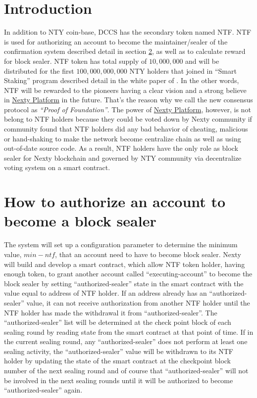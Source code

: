 \documentclass[12pt,oneside]{amsart}
\begin{document}
\setlength{\columnsep}{20pt}
\begin{multicols}{2}

\section{Introduction}\label{sec:introduction}
In addition to {\small NTY} coin-base, {\small DCCS} has the secondary token named {\small NTF}. {\small NTF} is used for authorizing an account to become the maintainer/sealer of the confirmation system described detail in section \ref{sec:authorize}, as well as to calculate reward for block sealer. {\small NTF} token has total supply of $10,000,000$ and will be distributed for the first $100,000,000,000$ NTY holders that joined in ``Smart Staking'' program described detail in the white paper of \cite{smart-taking}. In the other words, {\small NTF} will be rewarded to the pioneers having a clear vision and a strong believe in \href{https://nexty.io}{Nexty Platform} in the future. That's the reason why we call the new consensus protocol as \textit{``Proof of Foundation''}. The power of \href{https://nexty.io}{Nexty Platform}, however, is not belong to {\small NTF} holders because they could be voted down by Nexty community if community found that {\small NTF} holders did any bad behavior of cheating, malicious or hand-shaking to make the network become centralize chain as well as using out-of-date source code. As a result, {\small NTF} holders have the only role as block sealer for Nexty blockchain and governed  by {\small NTY} community via decentralize voting system on a smart contract.

\section{How to authorize an account to become a block sealer}\label{sec:authorize}
The system will set up a configuration parameter to determine the minimum value, $min-ntf$, that an account need to have to become block sealer. Nexty will build and develop a smart contract, which allow {\small NTF} token holder, having enough token, to grant another account called ``executing-account'' to become the block sealer by setting ``authorized-sealer'' state in the smart contract with the value equal to address of {\small NTF} holder. If an address already has an ``authorized-sealer'' value, it can not receive authorization from another NTF holder until the NTF holder has made the withdrawal it from ``authorized-sealer''. The ``authorized-sealer'' list will be determined at the check point block of each sealing round by reading state from the smart contract at that point of time. If in the current sealing round, any ``authorized-sealer'' does not perform at least one sealing activity, the ``authorized-sealer'' value will be withdrawn to its {\small NTF} holder by updating the state of the smart contract at the checkpoint block number of the next sealing round and of course that ``authorized-sealer'' will not be involved in the next sealing rounds until it will be authorized to become ``authorized-sealer'' again.


\end{multicols}
\end{document}
